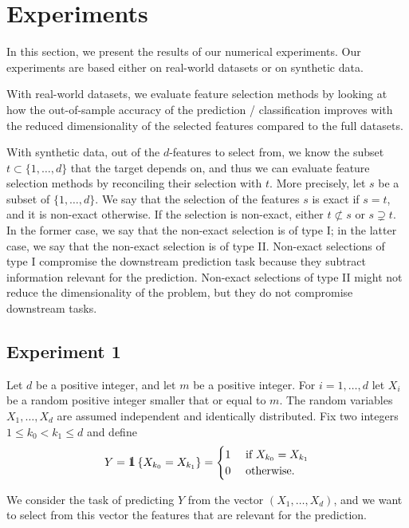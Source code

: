\section{Experiments}
In this section,
we present the results of our numerical experiments.
Our experiments are based
either 
on real-world datasets
or on synthetic data.

With real-world datasets,
we evaluate
feature selection methods
by looking at 
how
the out-of-sample accuracy of the prediction / classification
improves with the reduced dimensionality of the selected features
compared to the full datasets.

With synthetic data, 
out 
of the $d$-features to select from,
we know the subset 
$t \subset \lbrace 1, \dots, d\rbrace$
that the target depends on,
and thus
we can evaluate feature selection methods
by reconciling their selection with $t$.
More precisely,
let 
$s$ 
be a subset of 
$\lbrace1, \dots, d\rbrace$.
We say that 
the selection of the features 
$s$ is exact if $s=t$,
and it is non-exact otherwise. 
If the selection is non-exact,
either 
$t \not \subset s$
or
$s \supsetneq t$.
In the former case, 
we say that the non-exact selection is of type I;
in the latter case,
we say that the non-exact selection is of type II. 
Non-exact selections of type I 
compromise the downstream prediction task 
because 
they subtract information relevant for the prediction.
Non-exact selections of type II
might not reduce the dimensionality of the problem,
but they do not compromise downstream tasks. 


\subsection{Experiment 1}
Let
$d$
be a positive integer,
and 
let 
$m$
be  a positive integer.
For
$i = 1, \dots, d$
let
$X_i$
be a random  positive integer
smaller that or equal to $m$.
The random variables
$X_1, \dots, X_d$
are assumed independent and identically distributed.
Fix 
two integers
$ 1 \leq k_0 < k_1 \leq d$
and 
define
\begin{equation}
	\label{eq.exp1Y}
	Y = \one\left\lbrace
	X_{k_0} = X_{k_1}
	\right
	\rbrace
	=
	\begin{cases}
		1 & \text{ if } X_{k_0} = X_{k_1}
		\\
		0 & \text{ otherwise}.
	\end{cases}
\end{equation}

We consider the task of predicting $Y$ from the vector 
$(X_1, \dots, X_d)$,
and 
we want to select 
from this vector 
the features that are relevant for the prediction.


